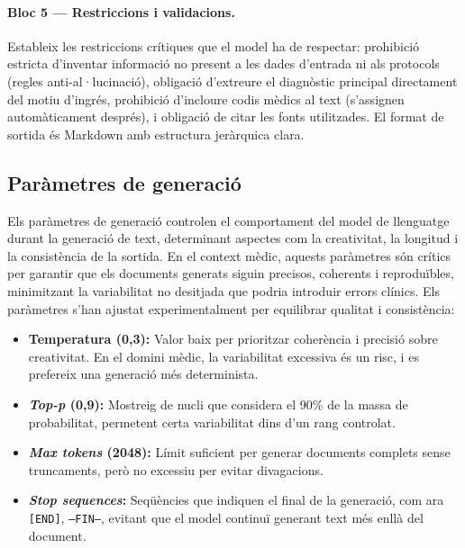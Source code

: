 \documentclass[CAT]{TFUOC}%
\begin{document}
\paragraph{Bloc 5 --- Restriccions i validacions.}
Estableix les restriccions crítiques que el model ha de respectar: prohibició estricta d'inventar informació no present a les dades d'entrada ni als protocols (regles anti-al·lucinació), obligació d'extreure el diagnòstic principal directament del motiu d'ingrés, prohibició d'incloure codis mèdics al text (s'assignen automàticament després), i obligació de citar les fonts utilitzades. El format de sortida és Markdown amb estructura jeràrquica clara.

\subsection{Paràmetres de generació}

Els paràmetres de generació controlen el comportament del model de llenguatge durant la generació de text, determinant aspectes com la creativitat, la longitud i la consistència de la sortida. En el context mèdic, aquests paràmetres són crítics per garantir que els documents generats siguin precisos, coherents i reproduïbles, minimitzant la variabilitat no desitjada que podria introduir errors clínics. Els paràmetres s'han ajustat experimentalment per equilibrar qualitat i consistència:

\begin{itemize}
    \item \textbf{Temperatura (0,3):} Valor baix per prioritzar coherència i precisió sobre creativitat. En el domini mèdic, la variabilitat excessiva és un risc, i es prefereix una generació més determinista.

    \item \textbf{\textit{Top-p} (0,9):} Mostreig de nucli que considera el 90\% de la massa de probabilitat, permetent certa variabilitat dins d'un rang controlat.

    \item \textbf{\textit{Max tokens} (2048):} Límit suficient per generar documents complets sense truncaments, però no excessiu per evitar divagacions.

    \item \textbf{\textit{Stop sequences}:} Seqüències que indiquen el final de la generació, com ara \texttt{[END]}, \texttt{---FIN---}, evitant que el model continuï generant text més enllà del document.
\end{itemize}
\end{document}
